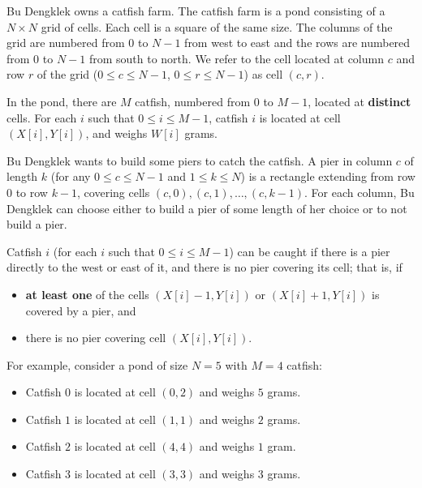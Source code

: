 Bu Dengklek owns a catfish farm.
The catfish farm is a pond consisting of a $N \times N$ grid of cells.
Each cell is a square of the same size.
The columns of the grid are numbered from $0$ to $N - 1$ from west to east and the rows are numbered from $0$ to $N - 1$ from south to north.
We refer to the cell located at column $c$ and row $r$ of the grid ($0 \le c \le N - 1$, $0 \le r \le N - 1$) as cell $(c, r)$.

In the pond, there are $M$ catfish, numbered from $0$ to $M - 1$, located at \textbf{distinct} cells.
For each $i$ such that $0 \le i \le M - 1$, catfish $i$ is located at cell $(X[i], Y[i])$, and weighs $W[i]$ grams.

Bu Dengklek wants to build some piers to catch the catfish.
A pier in column $c$ of length $k$ (for any $0 \le c \le N - 1$ and $1 \le k \le N$) is a rectangle extending from row $0$ to row $k - 1$, covering cells $(c, 0), (c, 1), \ldots, (c, k - 1)$.
For each column, Bu Dengklek can choose either to build a pier of some length of her choice or to not build a pier.

Catfish $i$ (for each $i$ such that $0 \le i \le M - 1$) can be caught if there is a pier directly to the west or east of it, and there is no pier covering its cell; that is, if

\begin{itemize}
    \item \textbf{at least one} of the cells $(X[i] - 1, Y[i])$ or $(X[i] + 1, Y[i])$ is covered by a pier, and
    \item there is no pier covering cell $(X[i], Y[i])$.
\end{itemize}

For example, consider a pond of size $N = 5$ with $M = 4$ catfish:
\begin{itemize}
    \item Catfish $0$ is located at cell $(0, 2)$ and weighs $5$ grams.
    \item Catfish $1$ is located at cell $(1, 1)$ and weighs $2$ grams.
    \item Catfish $2$ is located at cell $(4, 4)$ and weighs $1$ gram.
    \item Catfish $3$ is located at cell $(3, 3)$ and weighs $3$ grams.
\end{itemize}



